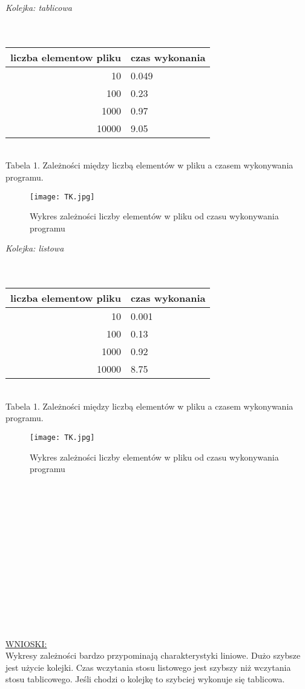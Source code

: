 \documentclass[11pt]{article}
\begin{document}
\textit{Kolejka: tablicowa }
\\ \\ \\
\begin{tabular}{|r|l|}
  \hline 
  liczba elementow pliku & czas wykonania \\
  \hline
  10 & 0.049 \\
  \hline
  100 & 0.23 \\
  \hline
  1000 & 0.97 \\
  \hline
  10000 & 9.05 \\
  \hline
\end{tabular} 
\\ Tabela 1. Zależności między liczbą elementów w pliku a czasem wykonywania programu.
\\
\begin{figure}[ht!]
\centering
\texttt{[image: TK.jpg]}
\caption{Wykres zależności liczby elementów w pliku od czasu wykonywania programu}
\label{overflow}
\end{figure}

\textit{Kolejka: listowa }
\\ \\ \\
\begin{tabular}{|r|l|}
  \hline 
  liczba elementow pliku & czas wykonania \\
  \hline
  10 & 0.001 \\
  \hline
  100 & 0.13 \\
  \hline
  1000 & 0.92 \\
  \hline
  10000 & 8.75 \\
  \hline
\end{tabular} 
\\ Tabela 1. Zależności między liczbą elementów w pliku a czasem wykonywania programu.
\\
\begin{figure}[ht!]
\centering
\texttt{[image: TK.jpg]}
\caption{Wykres zależności liczby elementów w pliku od czasu wykonywania programu}
\label{overflow}
\end{figure}
\\ \\ \\ \\ \\ \\ \\ \\ \\ \\ \\ \\ \\
\underline {WNIOSKI:} \\
Wykresy zależności bardzo przypominają charakterystyki liniowe. Dużo szybsze jest użycie kolejki. Czas wczytania stosu listowego jest szybszy niż wczytania stosu tablicowego. Jeśli chodzi o kolejkę to szybciej wykonuje się tablicowa.
\end{document}
